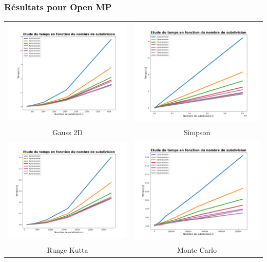 \documentclass[10pt]{beamer}
\begin{document}
\begin{frame}
    \frametitle{Résultats pour Open MP}
        \small
    \begin{tabular}{cc}
        \includegraphics[width=0.45\linewidth]{../Images/time_gauss_Op_MP.png} &
        \includegraphics[width=0.45\linewidth]{../Images/time_simp_Op_MP.png} \\
        Gauss 2D & Simpson \\
        \includegraphics[width=0.45\linewidth]{../Images/time_RK_Op_MP.png} &
        \includegraphics[width=0.45\linewidth]{../Images/time_montecarlo_Op_MP.png} \\
        Runge Kutta & Monte Carlo \\
    \end{tabular}
        

\end{frame}
\end{document}
